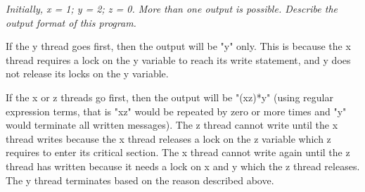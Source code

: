 \documentclass[letterpaper,11pt]{article}
\begin{document}
\begin{enumerate}
\emph{Initially, x = 1; y = 2; z = 0. More than one output is possible. Describe the output format of this program.}

If the y thread goes first, then the output will be "y" only.  This is because the x thread requires a lock on the y variable to reach its write statement, and y does not release its locks on the y variable.

If the x or z threads go first, then the output will be "(xz)*y" (using regular expression terms, that is "xz" would be repeated by zero or more times and "y" would terminate all written messages).  The z thread cannot write until the x thread writes because the x thread releases a lock on the z variable which z requires to enter its critical section.  The x thread cannot write again until the z thread has written because it needs a lock on x and y which the z thread releases.  The y thread terminates based on the reason described above.
\end{enumerate}
\end{document}
